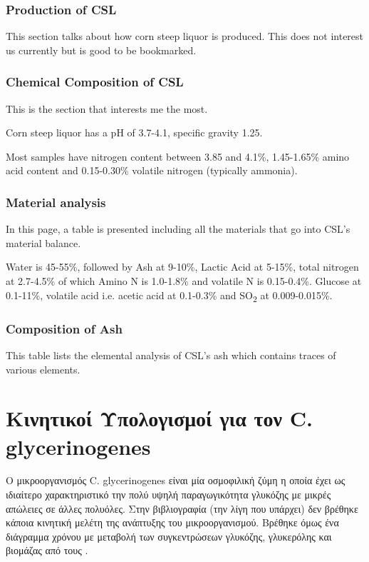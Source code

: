 \documentclass[11pt]{article}
\begin{document}
\subsubsection{Production of CSL}
\label{sec:orgb2222a7}
This section talks about how corn steep liquor is produced. This does not interest us currently but is good to be bookmarked.
\subsubsection{Chemical Composition of CSL}
\label{sec:org7fadaf8}
This is the section that interests me the most.

Corn steep liquor has a pH of 3.7-4.1, specific gravity 1.25.

Most samples have nitrogen content between 3.85 and 4.1\%, 1.45-1.65\% amino acid content and 0.15-0.30\% volatile nitrogen (typically ammonia).
\subsubsection{Material analysis}
\label{sec:org2fdd9a5}
In this page, a table is presented including all the materials that go into CSL's material balance.

Water is 45-55\%, followed by Ash at 9-10\%, Lactic Acid at 5-15\%, total nitrogen at 2.7-4.5\% of which Amino N is 1.0-1.8\% and volatile N is 0.15-0.4\%. Glucose at 0.1-11\%, volatile acid i.e. acetic acid at 0.1-0.3\% and SO\textsubscript{2} at 0.009-0.015\%.
\subsubsection{Composition of Ash}
\label{sec:org0288c12}
This table lists the elemental analysis of CSL's ash which contains traces of various elements.

\section{Κινητικοί Υπολογισμοί για τον C. glycerinogenes}
\label{sec:org2b6b6e0}

Ο μικροοργανισμός C. glycerinogenes είναι μία οσμοφιλική ζύμη η οποία έχει ως ιδιαίτερο χαρακτηριστικό την πολύ υψηλή παραγωγικότητα γλυκόζης με μικρές απώλειες σε άλλες πολυόλες. Στην βιβλιογραφία (την λίγη που υπάρχει) δεν βρέθηκε κάποια κινητική μελέτη της ανάπτυξης του μικροοργανισμού. Βρέθηκε όμως ένα διάγραμμα χρόνου με μεταβολή των συγκεντρώσεων γλυκόζης, γλυκερόλης και βιομάζας από τους \cite{jinByproductFormationNovel2003}.
\end{document}
